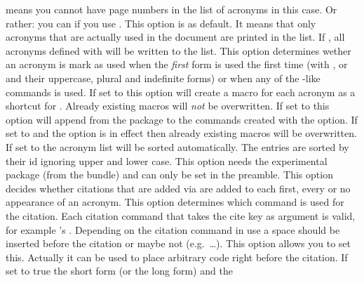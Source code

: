 \documentclass[load-preamble+,scrartcl={DIV10}]{cnltx-doc}
\begin{document}
\begin{options}
    means you cannot have page numbers in the list of acronyms in this case.
    Or rather: you can if you use .
    This option is  as default.  It means that only acronyms that
    are actually used in the document are printed in the list.  If
    , all acronyms defined with  will be
    written to the list.
    This option determines wether an acronym is mark as used when the
    \emph{first} form is used the first time (with ,  or
     and their uppercase, plural and indefinite forms) or when any
    of the -like commands is used.   
    If set to  this option will create a macro  for
    each acronym as a shortcut for .  Already existing macros
    will \emph{not} be overwritten.
    If set to  this option will append
     from the  package to the commands created with
    the  option.
    If set to  and the option  is in effect
    then already existing macros will be overwritten.
    If set to  the acronym list will be sorted automatically.  The
    entries are sorted by their \acs{id} ignoring upper and lower case.  This
    option needs the experimental package  (from the
     bundle) and can only be set in the preamble.
    This option decides whether citations that are added via  are
    added to each first, every or no appearance of an acronym.
    This option determines which command is used for the citation.  Each
    citation command that takes the cite key as argument is valid, for example
    's .
    Depending on the citation command in use a space should be inserted before
    the citation or maybe not (e.g.\ \ldots).  This option
    allows you to set this.  Actually it can be used to place arbitrary code
    right before the citation.
    If set to true the short form (or the long form) and the

\end{options}
\end{document}
